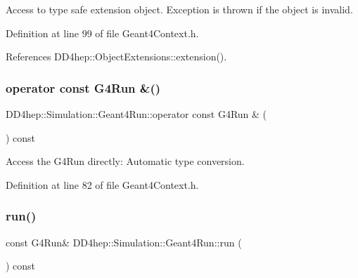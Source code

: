 Access to type safe extension object. Exception is thrown if the object is invalid. 



Definition at line 99 of file Geant4\+Context.\+h.



References D\+D4hep\+::\+Object\+Extensions\+::extension().

\hypertarget{class_d_d4hep_1_1_simulation_1_1_geant4_run_a2a3e5d37a3e604de125673b5a5c07ea6}{}\label{class_d_d4hep_1_1_simulation_1_1_geant4_run_a2a3e5d37a3e604de125673b5a5c07ea6} 
\subsubsection{\texorpdfstring{operator const G4\+Run \&()}{operator const G4Run \&()}}
{\footnotesize\ttfamily D\+D4hep\+::\+Simulation\+::\+Geant4\+Run\+::operator const G4\+Run \& (\begin{DoxyParamCaption}{ }\end{DoxyParamCaption}) const\hspace{0.3cm}{\ttfamily [inline]}}



Access the G4\+Run directly\+: Automatic type conversion. 



Definition at line 82 of file Geant4\+Context.\+h.

\hypertarget{class_d_d4hep_1_1_simulation_1_1_geant4_run_a43d61bb9443562c4402d062df6750191}{}\label{class_d_d4hep_1_1_simulation_1_1_geant4_run_a43d61bb9443562c4402d062df6750191} 
\subsubsection{\texorpdfstring{run()}{run()}}
{\footnotesize\ttfamily const G4\+Run\& D\+D4hep\+::\+Simulation\+::\+Geant4\+Run\+::run (\begin{DoxyParamCaption}{ }\end{DoxyParamCaption}) const\hspace{0.3cm}{\ttfamily [inline]}}



